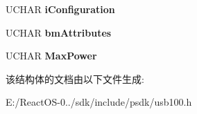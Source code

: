 \begin{DoxyCompactItemize}
U\+C\+H\+AR {\bfseries i\+Configuration}
\item 
\mbox{\label{struct___u_s_b___c_o_n_f_i_g_u_r_a_t_i_o_n___d_e_s_c_r_i_p_t_o_r_adbce2437c8ce48da4b012fe798da236f}} 
U\+C\+H\+AR {\bfseries bm\+Attributes}
\item 
\mbox{\label{struct___u_s_b___c_o_n_f_i_g_u_r_a_t_i_o_n___d_e_s_c_r_i_p_t_o_r_aaf8429bc5a7201d7316fce6be21f2de9}} 
U\+C\+H\+AR {\bfseries Max\+Power}
\end{DoxyCompactItemize}


该结构体的文档由以下文件生成\+:\begin{DoxyCompactItemize}
\item 
E\+:/\+React\+O\+S-\/0../sdk/include/psdk/usb100.\+h\end{DoxyCompactItemize}
